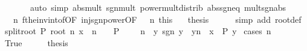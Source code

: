\begin{isabellebody}
\ \ \ \ \ \ \ {\isacharparenleft}{\kern0pt}auto\ simp{\isacharcolon}{\kern0pt}\ abs{\isacharunderscore}{\kern0pt}mult\ sgn{\isacharunderscore}{\kern0pt}mult\ power{\isacharunderscore}{\kern0pt}mult{\isacharunderscore}{\kern0pt}distrib\ abs{\isacharunderscore}{\kern0pt}sgn{\isacharunderscore}{\kern0pt}eq\ mult{\isacharunderscore}{\kern0pt}sgn{\isacharunderscore}{\kern0pt}abs{\isacharparenright}{\kern0pt}\isanewline
\ \ \isamarkupfalse%
\ {\isacartoucheopen}{}\ {\isacharless}{\kern0pt}\ n{\isacartoucheclose}\ f{\isacharunderscore}{\kern0pt}the{\isacharunderscore}{\kern0pt}inv{\isacharunderscore}{\kern0pt}into{\isacharunderscore}{\kern0pt}f{\isacharbrackleft}{\kern0pt}OF\ inj{\isacharunderscore}{\kern0pt}sgn{\isacharunderscore}{\kern0pt}power{\isacharbrackleft}{\kern0pt}OF\ {\isacartoucheopen}{}\ {\isacharless}{\kern0pt}\ n{\isacartoucheclose}{\isacharbrackright}{\kern0pt}\ this{\isacharbrackright}{\kern0pt}\ \ \isamarkupfalse%
\ {\isacharquery}{\kern0pt}thesis\isanewline
\ \ \ \ \isamarkupfalse%
\ {\isacharparenleft}{\kern0pt}simp\ add{\isacharcolon}{\kern0pt}\ root{\isacharunderscore}{\kern0pt}def{\isacharparenright}{\kern0pt}\isanewline
{}\isamarkupfalse%
%
\endisatagproof
{\isafoldproof}%
%
\isadelimproof
\isanewline
%
\endisadelimproof
\isanewline
{}\isamarkupfalse%
\ split{\isacharunderscore}{\kern0pt}root{\isacharcolon}{\kern0pt}\ {\isachardoublequoteopen}P\ {\isacharparenleft}{\kern0pt}root\ n\ x{\isacharparenright}{\kern0pt}\ {\isasymlongleftrightarrow}\ {\isacharparenleft}{\kern0pt}n\ {\isacharequal}{\kern0pt}\ {}\ {\isasymlongrightarrow}\ P\ {}{\isacharparenright}{\kern0pt}\ {\isasymand}\ {\isacharparenleft}{\kern0pt}{}\ {\isacharless}{\kern0pt}\ n\ {\isasymlongrightarrow}\ {\isacharparenleft}{\kern0pt}{\isasymforall}y{\isachardot}{\kern0pt}\ sgn\ y\ {\isacharasterisk}{\kern0pt}\ {\isasymbar}y{\isasymbar}{\isacharcircum}{\kern0pt}n\ {\isacharequal}{\kern0pt}\ x\ {\isasymlongrightarrow}\ P\ y{\isacharparenright}{\kern0pt}{\isacharparenright}{\kern0pt}{\isachardoublequoteclose}\isanewline
%
\isadelimproof
%
\endisadelimproof
%
\isatagproof
{}\isamarkupfalse%
\ {\isacharparenleft}{\kern0pt}cases\ {\isachardoublequoteopen}n\ {\isacharequal}{\kern0pt}\ {}{\isachardoublequoteclose}{\isacharparenright}{\kern0pt}\isanewline
\ \ \isamarkupfalse%
\ True\isanewline
\ \ \isamarkupfalse%
\ \isamarkupfalse%
\ {\isacharquery}{\kern0pt}thesis\ \isamarkupfalse%

\end{isabellebody}
